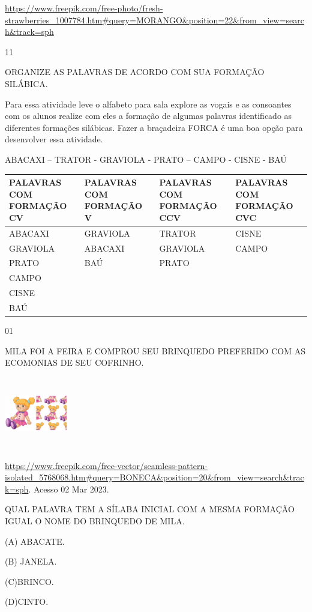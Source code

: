 {{\url{https://www.freepik.com/free-photo/fresh-strawberries_1007784.htm\#query=MORANGO\&position=22\&from_view=search\&track=sph}

\num{11}

ORGANIZE AS PALAVRAS DE ACORDO COM SUA FORMAÇÃO SILÁBICA.

Para essa atividade leve o alfabeto para sala explore as vogais e as
consoantes com os alunos realize com eles a formação de algumas palavras
identificado as diferentes formações silábicas. Fazer a braçadeira FORCA
é uma boa opção para desenvolver essa atividade.

ABACAXI -- TRATOR - GRAVIOLA - PRATO -- CAMPO - CISNE - BAÚ

\begin{longtable}[]{@{}llll@{}}
\toprule
\textbf{PALAVRAS COM FORMAÇÃO CV} & \textbf{PALAVRAS COM FORMAÇÃO V} &
\textbf{PALAVRAS COM FORMAÇÃO CCV} & \textbf{PALAVRAS COM FORMAÇÃO
CVC}\tabularnewline
\midrule
\endhead
ABACAXI & GRAVIOLA & TRATOR & CISNE\tabularnewline
GRAVIOLA & ABACAXI & GRAVIOLA & CAMPO\tabularnewline
PRATO & BAÚ & PRATO &\tabularnewline
CAMPO & & &\tabularnewline
CISNE & & &\tabularnewline
BAÚ & & &\tabularnewline
\bottomrule
\end{longtable}

\protect\hypertarget{_Hlk128577322}{}{}


\num{01}

MILA FOI A FEIRA E COMPROU SEU BRINQUEDO PREFERIDO COM AS ECOMONIAS DE
SEU COFRINHO.

\includegraphics[width=1.08889in,height=1.24236in]{media/image77.jpeg}

\url{https://www.freepik.com/free-vector/seamless-pattern-isolated_5768068.htm\#query=BONECA\&position=20\&from_view=search\&track=sph}.
Acesso 02 Mar 2023.

QUAL PALAVRA TEM A SÍLABA INICIAL COM A MESMA FORMAÇÃO IGUAL O NOME DO
BRINQUEDO DE MILA.

(A) ABACATE.

(B) JANELA.

(C)BRINCO.

(D)CINTO.

}}
